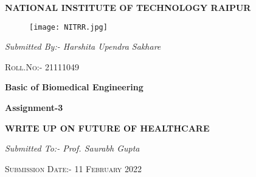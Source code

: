 \documentclass[12pt,a4paper]{article}
\begin{document}


\begin{center}
\textbf{NATIONAL INSTITUTE OF TECHNOLOGY RAIPUR}
\end{center}

\begin{figure}[h]
\centering
\texttt{[image: NITRR.jpg]}
\end{figure}

\hspace{2cm}

\begin{center}
\textit{Submitted By:- Harshita Upendra Sakhare}
\end{center}
\hspace{2cm}
\begin{center}
\textsc{Roll.No:- 21111049}
\end{center}
\hspace{2cm}
\begin{center}
\textbf{Basic of Biomedical Engineering}
\end{center}

\begin{center}
\textbf{Assignment-3}
\end{center}



\hspace{2cm}


\begin{center}
\textbf{WRITE UP ON FUTURE OF HEALTHCARE}
\end{center}

\hspace{2cm}

\begin{center}
\textit{Submitted To:- Prof. Saurabh Gupta}
\end{center}

\hspace{2cm}


\begin{center}
\textsc{Submission Date:- 11 February 2022}
\end{center}

\clearpage


\tableofcontents
\clearpage
\end{document}
